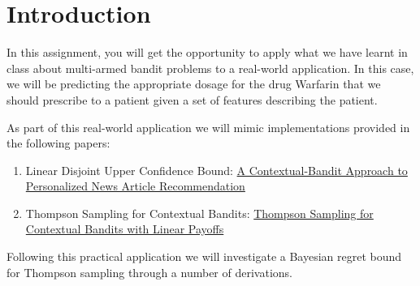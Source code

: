 \section{Introduction}

In this assignment, you will get the opportunity to apply what we have learnt in class about multi-armed bandit problems to a real-world application. In this case, we will be predicting the appropriate dosage for the drug Warfarin that we should prescribe to a patient given a set of features describing the patient.

As part of this real-world application we will mimic implementations provided in the following papers:

\begin{enumerate}
  \item Linear Disjoint Upper Confidence Bound: \href{https://arxiv.org/pdf/1003.0146.pdf}{A Contextual-Bandit Approach to
Personalized News Article Recommendation}
  \item Thompson Sampling for Contextual Bandits: \href{http://proceedings.mlr.press/v28/agrawal13.pdf}{Thompson Sampling for Contextual Bandits with Linear Payoffs}
\end{enumerate}

Following this practical application we will investigate a Bayesian regret bound for Thompson sampling through a number of derivations.
